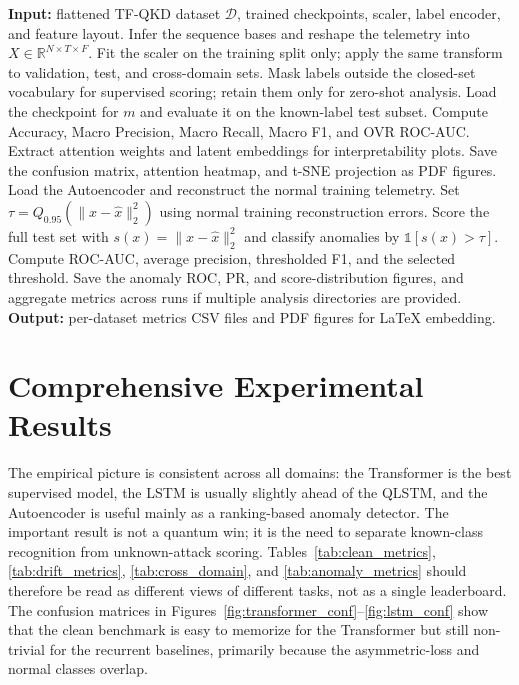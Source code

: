 \begin{algorithm}[!t]
\caption{TF-QKD Telemetry Evaluation and Cross-Domain Scoring}
\label{alg:evaluation}
\begin{algorithmic}[1]
\STATE \textbf{Input:} flattened TF-QKD dataset $\mathcal{D}$, trained checkpoints, scaler, label encoder, and feature layout.
\STATE Infer the sequence bases and reshape the telemetry into $X \in \mathbb{R}^{N \times T \times F}$.
\STATE Fit the scaler on the training split only; apply the same transform to validation, test, and cross-domain sets.
\STATE Mask labels outside the closed-set vocabulary for supervised scoring; retain them only for zero-shot analysis.
    \STATE Load the checkpoint for $m$ and evaluate it on the known-label test subset.
    \STATE Compute Accuracy, Macro Precision, Macro Recall, Macro F1, and OVR ROC-AUC.
        \STATE Extract attention weights and latent embeddings for interpretability plots.
        \STATE Save the confusion matrix, attention heatmap, and t-SNE projection as PDF figures.
    \ENDIF
\ENDFOR
\STATE Load the Autoencoder and reconstruct the normal training telemetry.
\STATE Set $\tau = Q_{0.95}(\|x-\hat{x}\|_2^2)$ using normal training reconstruction errors.
\STATE Score the full test set with $s(x)=\|x-\hat{x}\|_2^2$ and classify anomalies by $\mathbb{1}[s(x)>\tau]$.
\STATE Compute ROC-AUC, average precision, thresholded F1, and the selected threshold.
\STATE Save the anomaly ROC, PR, and score-distribution figures, and aggregate metrics across runs if multiple analysis directories are provided.
\STATE \textbf{Output:} per-dataset metrics CSV files and PDF figures for LaTeX embedding.
\end{algorithmic}
\end{algorithm}

\section{Comprehensive Experimental Results}
The empirical picture is consistent across all domains: the Transformer is the best supervised model, the LSTM is usually slightly ahead of the QLSTM, and the Autoencoder is useful mainly as a ranking-based anomaly detector. The important result is not a quantum win; it is the need to separate known-class recognition from unknown-attack scoring. Tables~\ref{tab:clean_metrics}, \ref{tab:drift_metrics}, \ref{tab:cross_domain}, and \ref{tab:anomaly_metrics} should therefore be read as different views of different tasks, not as a single leaderboard. The confusion matrices in Figures~\ref{fig:transformer_conf}--\ref{fig:lstm_conf} show that the clean benchmark is easy to memorize for the Transformer but still non-trivial for the recurrent baselines, primarily because the asymmetric-loss and normal classes overlap.
